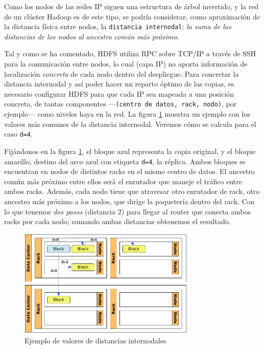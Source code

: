 Como los nodos de las redes IP siguen una estructura de \'arbol invertido, y la red de un cl\'uster Hadoop es de este tipo, se podr\'ia considerar, como aproximaci\'on de la distancia f\'isica entre nodos, la \texttt{distancia internodal}: \emph{la suma de las distancias de los nodos al ancestro com\'un m\'as pr\'oximo}.\newline

Tal y como se ha comentado, HDFS utiliza RPC sobre TCP/IP a trav\'es de SSH para la comunicaci\'on entre nodos, lo cual (capa IP) no aporta informaci\'on de localizaci\'on \emph{concreta} de cada nodo dentro del despliegue. Para concretar la distancia internodal y as\'i poder hacer un reparto \'optimo de las copias, es necesario configurar HDFS para que cada IP sea mapeada a una posici\'on concreta, de tantas componentes ---\texttt{(centro de datos, rack, nodo)}, por ejemplo--- como niveles haya en la red. La figura \ref{fig:distnodos} muestra un ejemplo con los valores m\'as comunes de la distancia internodal. Veremos c\'omo se calcula para el caso \texttt{d=4}.\newline

Fij\'andonos en la figura \ref{fig:distnodos}, el bloque azul representa la copia original, y el bloque amarillo, destino del arco azul con etiqueta \texttt{d=4}, la r\'eplica. Ambos bloques se encuentran en nodos de distintos racks en el mismo centro de datos. El ancestro com\'un m\'as pr\'oximo entre ellos ser\'a el enrutador que maneje el tr\'afico entre ambos racks. Adem\'as, cada nodo tiene que atravesar otro enrutador de rack, otro ancestro m\'as pr\'oximo a los nodos, que dirige la paqueter\'ia dentro del rack. Con lo que tenemos \emph{dos pasos} (distancia 2) para llegar al router que conecta ambos racks por cada nodo; sumando ambas distancias obtenemos el resultado.

\begin{figure}[tbp]
\begin{center}
\includegraphics[width=0.75\textwidth]{imagenes/018.pdf}
 \caption{Ejemplo de valores de distancias internodales}
\label{fig:distnodos}
\end{center}
\end{figure}



